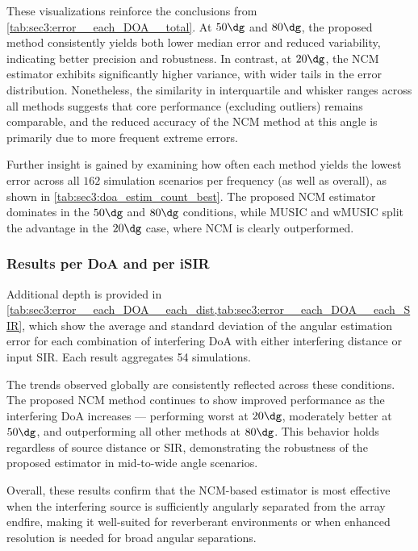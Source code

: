These visualizations reinforce the conclusions from \cref{tab:sec3:error__each_DOA__total}. At $50\dg$ and $80\dg$, the proposed method consistently yields both lower median error and reduced variability, indicating better precision and robustness. In contrast, at $20\dg$, the NCM estimator exhibits significantly higher variance, with wider tails in the error distribution. Nonetheless, the similarity in interquartile and whisker ranges across all methods suggests that core performance (excluding outliers) remains comparable, and the reduced accuracy of the NCM method at this angle is primarily due to more frequent extreme errors.

Further insight is gained by examining how often each method yields the lowest error across all $162$ simulation scenarios per frequency (as well as overall), as shown in \cref{tab:sec3:doa_estim_count_best}. The proposed NCM estimator dominates in the $50\dg$ and $80\dg$ conditions, while MUSIC and wMUSIC split the advantage in the $20\dg$ case, where NCM is clearly outperformed.



\subsubsection*{Results per DoA and per iSIR}

Additional depth is provided in \cref{tab:sec3:error__each_DOA__each_dist,tab:sec3:error__each_DOA__each_SIR}, which show the average and standard deviation of the angular estimation error for each combination of interfering DoA with either interfering distance or input SIR. Each result aggregates 54 simulations.




The trends observed globally are consistently reflected across these conditions. The proposed NCM method continues to show improved performance as the interfering DoA increases — performing worst at $20\dg$, moderately better at $50\dg$, and outperforming all other methods at $80\dg$. This behavior holds regardless of source distance or SIR, demonstrating the robustness of the proposed estimator in mid-to-wide angle scenarios.

Overall, these results confirm that the NCM-based estimator is most effective when the interfering source is sufficiently angularly separated from the array endfire, making it well-suited for reverberant environments or when enhanced resolution is needed for broad angular separations.
